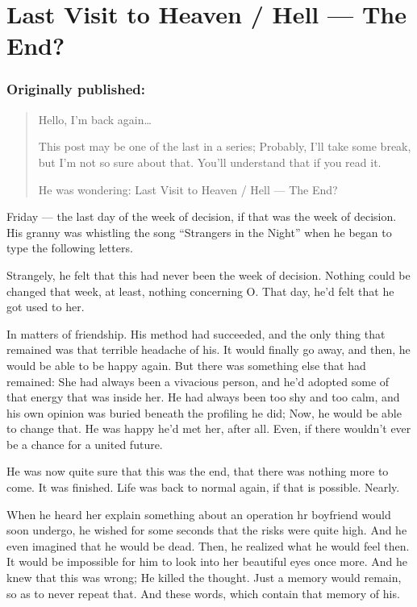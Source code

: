 \chapter{Last Visit to Heaven / Hell --- The End?}
\label{cha:last-visit-to-heaven-sl-hell-the-end}
\subsection*{Originally published: }
\begin{quote}
Hello, I'm back again\ldots

This post may be one of the last in a series; Probably, I'll take some break, but I'm not so sure about that. 
You'll understand that if you read it.

He was wondering: Last Visit to Heaven / Hell --- The End?
\end{quote}

Friday --- the last day of the week of decision, if that was the week of decision. 
His granny was whistling the song \enquote{Strangers in the Night} when he began to type the following letters. 

Strangely, he felt that this had never been the week of decision.
Nothing could be changed that week, at least, nothing concerning O. 
That day, he'd felt that he got used to her. 

In matters of friendship. His method had succeeded, and the only thing that remained was that terrible headache of his. 
It would finally go away, and then, he would be able to be happy again. 
But there was something else that had remained: She had always been a vivacious person, and he'd adopted some of that energy that was inside her. 
He had always been too shy and too calm, and his own opinion was buried beneath the profiling he did; Now, he would be able to change that. 
He was happy he'd met her, after all. 
Even, if there wouldn't ever be a chance for a united future.

He was now quite sure that this was the end, that there was nothing more to come. 
It was finished. 
Life was back to normal again, if that is possible. 
Nearly.

When he heard her explain something about an operation hr boyfriend would soon undergo, he wished for some seconds that the risks were quite high. 
And he even imagined that he would be dead. 
Then, he realized what he would feel then. It would be impossible for him to look into her beautiful eyes once more. 
And he knew that this was wrong; He killed the thought. 
Just a memory would remain, so as to never repeat that. 
And these words, which contain that memory of his.

